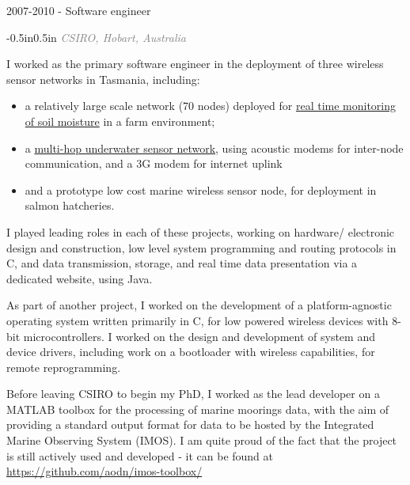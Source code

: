 \documentclass{resume}
\begin{document}
\begin{category}{2007-2010 - Software engineer}
\citemnobullet
\begin{changemargin}{-0.5in}{0.5in}
\textcolor{grey}{\textit{CSIRO, Hobart, Australia}}
\end{changemargin}

\citemnobullet I worked as the primary software engineer in the deployment of three
wireless sensor networks in Tasmania, including:\newline

\begin{itemize}
\item a relatively large scale network (70 nodes) deployed for \href{https://dl.acm.org/doi/10.1145/1435473.1435487}{real time monitoring of soil moisture} in a farm
environment;
\item a \href{https://doi.org/10.1109/OCEANSE.2009.5278177}{multi-hop underwater sensor network}, using
acoustic modems for inter-node communication, and a 3G modem for
internet uplink
\item and a prototype low cost marine wireless sensor node, for deployment in
salmon hatcheries.
\end{itemize}\leavevmode\newline

I played leading roles in each of these projects, working on hardware/
electronic design and construction, low level system programming and
routing protocols in C, and data transmission, storage, and real time
data presentation via a dedicated website, using Java.\newline

As part of another project, I worked on the development of a
platform-agnostic operating system written primarily in C, for low
powered wireless devices with 8-bit microcontrollers. I worked on the
design and development of system and device drivers, including work on
a bootloader with wireless capabilities, for remote reprogramming.\newline

Before leaving CSIRO to begin my PhD, I worked as the lead developer
on a MATLAB toolbox for the processing of marine moorings data, with
the aim of providing a standard output format for data to be hosted by
the Integrated Marine Observing System (IMOS). I am quite proud of the
fact that the project is still actively used and developed - it can be
found at \mbox{\small\url{https://github.com/aodn/imos-toolbox/}}

\end{category}
\end{document}
